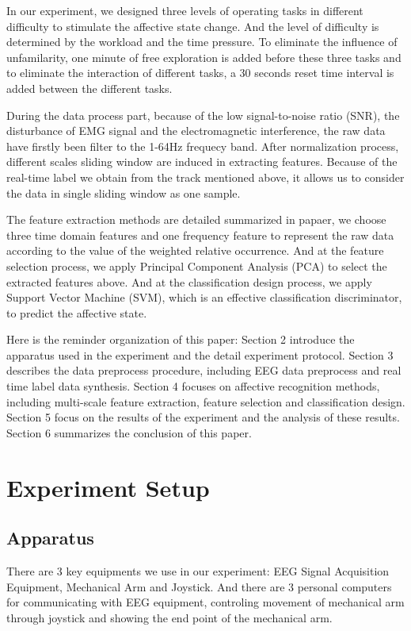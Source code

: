 \documentclass[runningheads,a4paper]{llncs}
\begin{document}
In our experiment, we designed three levels of operating tasks in different difficulty to
stimulate the affective state change. And the level of difficulty is determined by the
workload and the time pressure. To eliminate the influence of unfamilarity, one minute
of free exploration is added before these three tasks and to eliminate the interaction
of different tasks, a 30 seconds reset time interval is added between the different
tasks.

During the data process part, because of the low signal-to-noise ratio (SNR),
the disturbance of EMG signal and the electromagnetic interference, the raw data
have firstly been filter to the 1-64Hz frequecy band\cite{Feature}. After normalization
process, different scales sliding window are induced in extracting features. Because of
the real-time label we obtain from the track mentioned above, it allows us to consider the
data in single sliding window as one sample.

The feature extraction methods are detailed summarized in papaer\cite{Feature}, we choose
three time domain features and one frequency feature to represent the raw data according
to the value of the weighted relative occurrence. And at the feature selection process,
we apply Principal Component Analysis (PCA) to
select the extracted features above. And at the classification design process, we apply
Support Vector Machine (SVM), which is an effective classification discriminator,
to predict the affective state.

Here is the reminder organization of this paper: Section 2 introduce the
apparatus used in the experiment and the detail experiment protocol. Section 3
describes the data preprocess procedure, including EEG data preprocess and
real time label data synthesis. Section 4 focuses on affective recognition methods,
including multi-scale feature extraction, feature selection and
classification design. Section 5 focus on the results of the experiment and
the analysis of these results. Section 6 summarizes the conclusion of this paper.

\section{Experiment Setup}
\subsection{Apparatus}
There are 3 key equipments we use in our experiment: EEG Signal Acquisition Equipment,
Mechanical Arm and Joystick. And there are 3 personal computers for communicating
with EEG equipment, controling movement of mechanical arm through joystick and
showing the end point of the mechanical arm.
\end{document}
